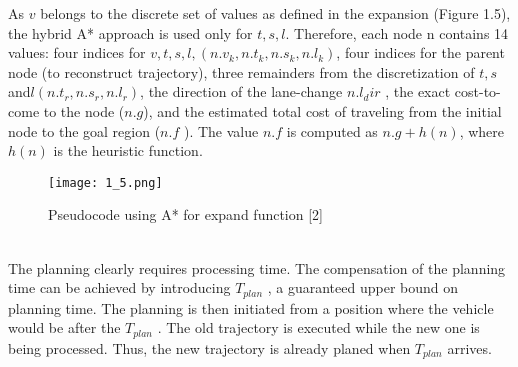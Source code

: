 \documentclass{report}
\begin{document}
\indent
As $v$ belongs to the discrete set of values as defined in the expansion (Figure 1.5), the hybrid A* approach is used only for $t, s, l$. Therefore, each node n contains 14 values: four indices for $v, t, s, l, (n.v_k , n.t_k , n.s_k , n.l_k )$, four indices for the parent node (to reconstruct trajectory), three remainders from the discretization of $t, s$ and$ l (n.t_r , n.s_r , n.l_r )$, the direction of the lane-change $n.l_dir$ , the exact
cost-to-come to the node ($n.g$), and the estimated total cost of traveling from the initial node to the goal region ($n.f$ ). The value $n.f$ is computed as $n.g + h(n)$, where $h(n)$ is the heuristic function.
   \begin{figure}[ht]
	\centering
	\texttt{[image: 1\_5.png]}
	\caption{Pseudocode using A* for expand function
		[2]}
	\label{fig:1.5} 
\end{figure}\\
\indent
The planning clearly requires processing time. The compensation of the planning time can be achieved by introducing $T_{plan}$ , a guaranteed upper bound on planning time. The planning is then initiated from a position where the vehicle would be after the $T_{plan}$ . The old trajectory is executed while the new one is being processed. Thus, the new trajectory is already planed when $T_{plan}$ arrives.
\end{document}
